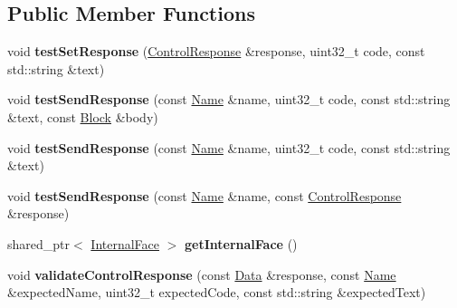 \subsection*{Public Member Functions}
\begin{DoxyCompactItemize}
\item 
void {\bfseries test\+Set\+Response} (\hyperlink{classndn_1_1mgmt_1_1ControlResponse}{Control\+Response} \&response, uint32\+\_\+t code, const std\+::string \&text)\hypertarget{classnfd_1_1tests_1_1ManagerBaseTest_af285e34935e4181fe93234995ae054e1}{}\label{classnfd_1_1tests_1_1ManagerBaseTest_af285e34935e4181fe93234995ae054e1}

\item 
void {\bfseries test\+Send\+Response} (const \hyperlink{classndn_1_1Name}{Name} \&name, uint32\+\_\+t code, const std\+::string \&text, const \hyperlink{classndn_1_1Block}{Block} \&body)\hypertarget{classnfd_1_1tests_1_1ManagerBaseTest_ad84a9e6d6f2443d67db04174ee108175}{}\label{classnfd_1_1tests_1_1ManagerBaseTest_ad84a9e6d6f2443d67db04174ee108175}

\item 
void {\bfseries test\+Send\+Response} (const \hyperlink{classndn_1_1Name}{Name} \&name, uint32\+\_\+t code, const std\+::string \&text)\hypertarget{classnfd_1_1tests_1_1ManagerBaseTest_abe3e215fc720477d79f8cdb28e7d924d}{}\label{classnfd_1_1tests_1_1ManagerBaseTest_abe3e215fc720477d79f8cdb28e7d924d}

\item 
void {\bfseries test\+Send\+Response} (const \hyperlink{classndn_1_1Name}{Name} \&name, const \hyperlink{classndn_1_1mgmt_1_1ControlResponse}{Control\+Response} \&response)\hypertarget{classnfd_1_1tests_1_1ManagerBaseTest_ab928b6f0b8fa69bea59f409b348fafe7}{}\label{classnfd_1_1tests_1_1ManagerBaseTest_ab928b6f0b8fa69bea59f409b348fafe7}

\item 
shared\+\_\+ptr$<$ \hyperlink{classnfd_1_1InternalFace}{Internal\+Face} $>$ {\bfseries get\+Internal\+Face} ()\hypertarget{classnfd_1_1tests_1_1ManagerBaseTest_a1b901bdbe91322586d3948767c2378f1}{}\label{classnfd_1_1tests_1_1ManagerBaseTest_a1b901bdbe91322586d3948767c2378f1}

\item 
void {\bfseries validate\+Control\+Response} (const \hyperlink{classndn_1_1Data}{Data} \&response, const \hyperlink{classndn_1_1Name}{Name} \&expected\+Name, uint32\+\_\+t expected\+Code, const std\+::string \&expected\+Text)\hypertarget{classnfd_1_1tests_1_1ManagerBaseTest_a0b6964ac04bd23cd503e5be972c0f128}{}\label{classnfd_1_1tests_1_1ManagerBaseTest_a0b6964ac04bd23cd503e5be972c0f128}


\end{DoxyCompactItemize}
